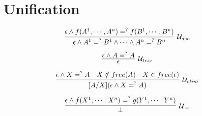 \section{Unification}

\begin{multicols}{2}
    \noindent
    \begin{minipage}{\linewidth}
        \[
            \infer[\mathcal{U}_{dec}]
            {\epsilon \land A^1 =^? B^1 \land \cdots \land A^n =^? B^n}
            {\epsilon \land f(A^1,\cdots,A^n) =^? f(B^1,\cdots,B^n)}
        \]
    \end{minipage}

    \noindent
    \begin{minipage}{\linewidth}
        \vspace{0.1cm}
        \[
            \infer[\mathcal{U}_{triv}]
            {\epsilon}
            {\epsilon \land A =^? A}
        \]
    \end{minipage}
\end{multicols}

\begin{multicols}{2}
    \noindent
    \begin{minipage}{\linewidth}
        \[
            \infer[\mathcal{U}_{elim}]
            {[A/X](\epsilon \land X =^? A)}
            {\epsilon \land X =^? A \quad X \notin free(A) \quad X \in free(\epsilon)}
        \]
    \end{minipage}

    \noindent
    \begin{minipage}{\linewidth}
        \[
            \infer[\mathcal{U} \bot]
            {\bot}
            {\epsilon \land f(X^1,\cdots,X^n) =^? g(Y^1,\cdots,Y^n)}
        \]
    \end{minipage}
\end{multicols}